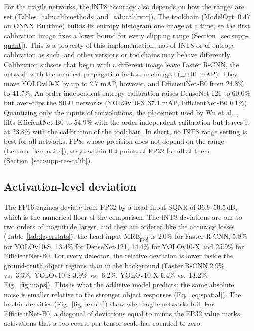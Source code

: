 \documentclass[pdflatex,sn-mathphys-num]{sn-jnl}%
\theoremstyle{thmstyleone}%
\theoremstyle{thmstyletwo}%
\theoremstyle{thmstylethree}%
\begin{document}
For the fragile networks, the INT8 accuracy also depends on how the ranges are set (Tables~\ref{tab:calibmethods} and~\ref{tab:calibvar}). The toolchain (ModelOpt~0.47 on ONNX Runtime) builds its entropy histogram one image at a time, so the first calibration image fixes a lower bound for every clipping range (Section~\ref{sec:supp-quant}). This is a property of this implementation, not of INT8 or of entropy calibration as such, and other versions or toolchains may behave differently. Calibration subsets that begin with a different image leave Faster R-CNN, the network with the smallest propagation factor, unchanged ($\pm0.01$ mAP). They move YOLOv10-X by up to 2.7 mAP, however, and EfficientNet-B0 from 24.8\% to 41.7\%. An order-independent entropy calibration raises DenseNet-121 to 60.0\% but over-clips the SiLU networks (YOLOv10-X 37.1 mAP, EfficientNet-B0 0.1\%). Quantizing only the inputs of convolutions, the placement used by Wu et al.~\cite{wu2020integer}, lifts EfficientNet-B0 to 54.9\% with the order-independent calibration but leaves it at 23.8\% with the calibration of the toolchain. In short, no INT8 range setting is best for all networks. FP8, whose precision does not depend on the range (Lemma~\ref{lem:noise}), stays within 0.4 points of FP32 for all of them (Section~\ref{sec:supp-res-calib}).

\subsection{Activation-level deviation}\label{sec:res-activations}
The FP16 engines deviate from FP32 by a head-input SQNR of 36.9--50.5\,dB, which is the numerical floor of the comparison. The INT8 deviations are one to two orders of magnitude larger, and they are ordered like the accuracy losses (Table~\ref{tab:layerstats}): the head-input $\mathrm{MRE}_\mathrm{proj}$ is 2.0\% for Faster R-CNN, 5.8\% for YOLOv10-S, 13.4\% for DenseNet-121, 14.4\% for YOLOv10-X and 25.9\% for EfficientNet-B0. For every detector, the relative deviation is lower inside the ground-truth object regions than in the background (Faster R-CNN 2.9\% vs.\ 3.3\%, YOLOv10-S 3.9\% vs.\ 6.2\%, YOLOv10-X 6.4\% vs.\ 13.2\%; Fig.~\ref{fig:maps}). This is what the additive model predicts: the same absolute noise is smaller relative to the stronger object responses (Eq.~\eqref{eq:spatial}). The hexbin densities (Fig.~\ref{fig:hexbin}) show why fragile networks fail. For EfficientNet-B0, a diagonal of deviations equal to minus the FP32 value marks activations that a too coarse per-tensor scale has rounded to zero.
\end{document}
